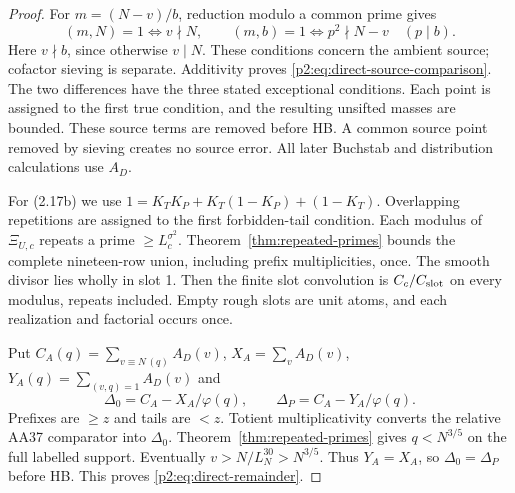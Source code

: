 \begin{proof}
For $m=(N-v)/b$, reduction modulo a common prime gives
\[
 (m,N)=1\iff v\nmid N,\qquad
 (m,b)=1\iff p^2\nmid N-v\quad(p\mid b).
\]
Here $v\nmid b$, since otherwise $v\mid N$.
These conditions concern the ambient source; cofactor sieving is separate.
Additivity proves \eqref{p2:eq:direct-source-comparison}.
The two differences have the three stated exceptional conditions.
Each point is assigned to the first true condition,
and the resulting unsifted masses are bounded.
These source terms are removed before HB.
A common source point removed by sieving creates no source error.
All later Buchstab and distribution calculations use $A_D$.

For (2.17b) we use $1=K_TK_P+K_T(1-K_P)+(1-K_T)$.
Overlapping repetitions are assigned to the first forbidden-tail condition.
Each modulus of $\Xi_{U,c}$ repeats a prime $\ge L_c^{\sigma^2}$.
Theorem~\ref{thm:repeated-primes} bounds the complete nineteen-row union,
including prefix multiplicities, once.
The smooth divisor lies wholly in slot 1.
Then the finite slot convolution is $C_c/C_{\rm slot}$ on every modulus, repeats included.
Empty rough slots are unit atoms, and each realization and factorial occurs once.

Put $C_A(q)=\sum_{v\equiv N\,(q)}A_D(v)$,
$X_A=\sum_vA_D(v)$, $Y_A(q)=\sum_{(v,q)=1}A_D(v)$ and
\[
 \Delta_0=C_A-X_A/\varphi(q),\qquad \Delta_P=C_A-Y_A/\varphi(q).
\]
Prefixes are $\ge z$ and tails are $<z$.
Totient multiplicativity converts the relative AA37 comparator into $\Delta_0$.
Theorem~\ref{thm:repeated-primes} gives $q<N^{3/5}$ on the full labelled support.
Eventually $v>N/L_N^{30}>N^{3/5}$.
Thus $Y_A=X_A$, so $\Delta_0=\Delta_P$ before HB.
This proves \eqref{p2:eq:direct-remainder}.
\end{proof}

